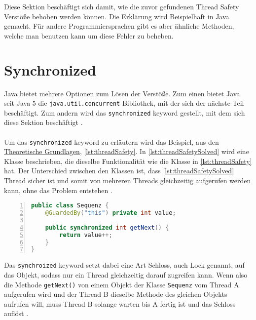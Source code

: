 \label{sec:loesen}

Diese Sektion beschäftigt sich damit, wie die zuvor gefundenen Thread Safety Verstöße behoben werden können. Die Erklärung wird Beispielhaft in Java gemacht. Für andere Programmiersprachen gibt es aber ähnliche Methoden, welche man benutzen kann um diese Fehler zu beheben.

\section{Synchronized}

 Java bietet mehrere Optionen zum Lösen der Verstöße. Zum einen bietet Java seit Java 5 die \texttt{java.util.concurrent} Bibliothek, mit der sich der nächste Teil beschäftigt. Zum andern wird das \texttt{synchronized} keyword gestellt, mit dem sich diese Sektion beschäftigt \cite[vgl.][121]{fekete_teaching_nodate}. \\
\\
 Um das \texttt{synchronized} keyword zu erläutern wird das Beispiel, aus den \hyperref[sec:threads]{Theoretische Grundlagen}, \ref{lst:threadSafety}. In \ref{lst:threadSafetySolved} wird eine Klasse beschrieben, die dieselbe Funktionalität wie die Klasse in \ref{lst:threadSafety} hat. Der Unterschied zwischen den Klassen ist, dass \ref{lst:threadSafetySolved} Thread sicher ist und somit von mehreren Threads gleichzeitig aufgerufen werden kann, ohne das Problem entstehen \cite[vgl.][5-6]{brian}. 
\\
 \begin{lstlisting}[language=Java,frame=tb,caption={Thread-safe Sequence Generator \cite{brian}}, label={lst:threadSafetySolved}, numbers=left, stepnumber=1, captionpos=b]
public class Sequenz {
	@GuardedBy("this") private int value;

	public synchronized int getNext() {
		return value++;
	}
}
\end{lstlisting}


Das \texttt{synchroized} keyword setzt dabei eine Art Schloss, auch Lock genannt, auf das Objekt, sodass nur ein Thread gleichzeitig darauf zugreifen kann. Wenn also die Methode \texttt{getNext()} von einem Objekt der Klasse \texttt{Sequenz} vom Thread A aufgerufen wird und der Thread B dieselbe Methode des gleichen Objekts aufrufen will, muss Thread B solange warten bis A fertig ist und das Schloss auflöst \cite[vgl.][17]{brian}.



